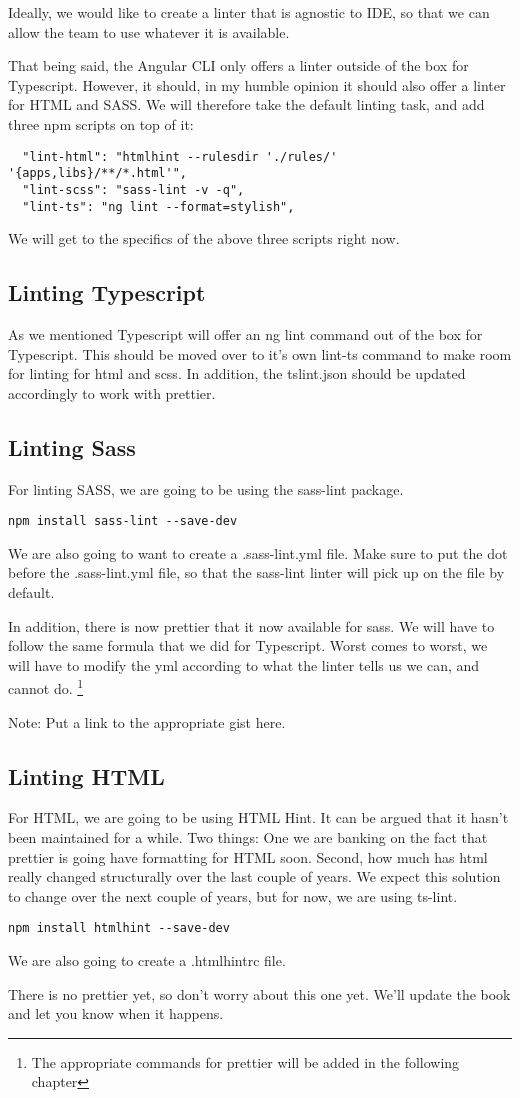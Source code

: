 Ideally, we would like to create a linter that is agnostic to IDE, so that we
can allow the team to use whatever it is available.

That being said, the Angular CLI only offers a linter outside of the box for
Typescript. However, it should, in my humble opinion it should also offer a
linter for HTML and SASS. We will therefore take the default linting task, and
add three npm scripts on top of it:

\begin{verbatim}
  "lint-html": "htmlhint --rulesdir './rules/' '{apps,libs}/**/*.html'",
  "lint-scss": "sass-lint -v -q",
  "lint-ts": "ng lint --format=stylish",
\end{verbatim}

We will get to the specifics of the above three scripts right now.

\subsection{ Linting Typescript }
As we mentioned Typescript will offer an ng lint command out of the box for
Typescript. This should be moved over to it's own lint-ts command to make room
for linting for html and scss. In addition, the tslint.json should be updated
accordingly to work with prettier.

\subsection{ Linting Sass }
For linting SASS, we are going to be using the sass-lint package.
\begin{lstlisting}
npm install sass-lint --save-dev
\end{lstlisting}

We are also going to want to create a .sass-lint.yml file. Make sure to put the
dot before the .sass-lint.yml file, so that the sass-lint linter will pick up
on the file by default.

In addition, there is now prettier that it now available for sass. We will have
to follow the same formula that we did for Typescript. Worst comes to worst, we
will have to modify the yml according to what the linter tells us we can, and
cannot do. \footnote{The appropriate commands for prettier will be added in the
following chapter}

Note: Put a link to the appropriate gist here.

\subsection{ Linting HTML }
For HTML, we are going to be using HTML Hint. It can be argued that it hasn't
been maintained for a while. Two things: One we are banking on the fact that
prettier is going have formatting for HTML soon. Second, how much has html really
changed structurally over the last couple of years. We expect this solution to
change over the next couple of years, but for now, we are using ts-lint.

\begin{lstlisting}
npm install htmlhint --save-dev
\end{lstlisting}

We are also going to create a .htmlhintrc file.

There is no prettier yet, so don't worry about this one yet. We'll update the
book and let you know when it happens.
